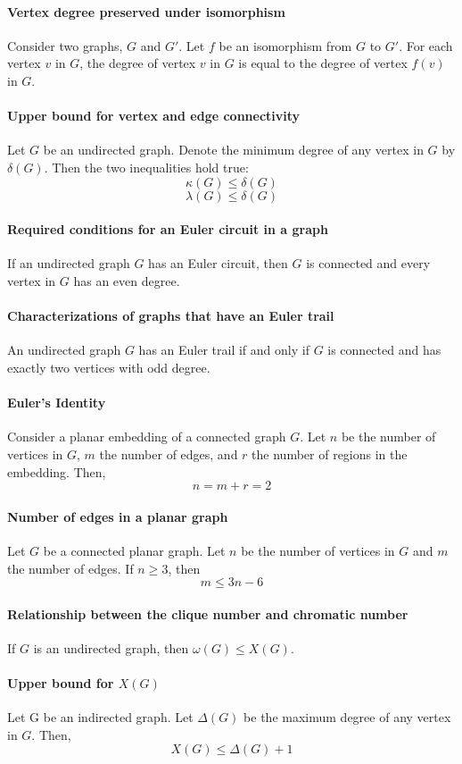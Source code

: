 \documentclass[a4paper]{article}
\begin{document}
\paragraph{Vertex degree preserved under isomorphism}
Consider two graphs, $G$ and $G'$. Let $f$ be an isomorphism from $G$ to $G'$. For each vertex $v$ in $G$, the degree of vertex $v$ in $G$ is equal to the degree of vertex $f(v)$ in $G$.
\paragraph{Upper bound for vertex and edge connectivity}
Let $G$ be an undirected graph. Denote the minimum degree of any vertex in $G$ by $\delta(G)$. Then the two inequalities hold true:
\begin{equation*}
  \kappa(G) \leq \delta(G)
\end{equation*}
\begin{equation*}
  \lambda(G) \leq \delta(G)
\end{equation*}
\paragraph{Required conditions for an Euler circuit in a graph}
If an undirected graph $G$ has an Euler circuit, then $G$ is connected and every vertex in $G$ has an even degree.
\paragraph{Characterizations of graphs that have an Euler trail} 
An undirected graph $G$ has an Euler trail if and only if $G$ is connected and has exactly two vertices with odd degree.
\paragraph{Euler's Identity}
Consider a planar embedding of a connected graph $G$. Let $n$ be the number of vertices in $G$, $m$ the number of edges, and $r$ the number of regions in the embedding. Then,
\begin{equation*}
  n = m + r = 2
\end{equation*}
\paragraph{Number of edges in a planar graph}
Let $G$ be a connected planar graph. Let $n$ be the number of vertices in $G$ and $m$ the number of edges. If $n \geq 3$, then
\begin{equation*}
  m \leq 3n - 6
\end{equation*}
\paragraph{Relationship between the clique number and chromatic number}
If $G$ is an undirected graph, then $\omega(G) \leq X(G)$.
\paragraph{Upper bound for $X(G)$}
Let G be an indirected graph. Let $\Delta(G)$ be the maximum degree of any vertex in $G$. Then,
\begin{equation*}
  X(G) \leq \Delta(G) + 1
\end{equation*}
\end{document}

